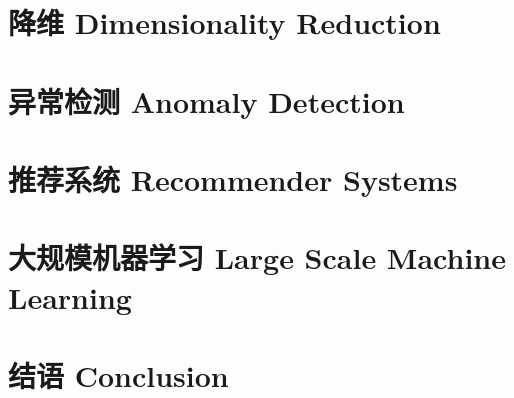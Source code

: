 \documentclass[12pt, a4paper]{article}
\begin{document}
    \section{降维 Dimensionality Reduction}

    \section{异常检测 Anomaly Detection}

    \section{推荐系统 Recommender Systems}

    \section{大规模机器学习 Large Scale Machine Learning}

    \section{结语 Conclusion}
\end{document}
